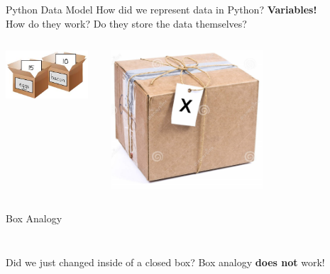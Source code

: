     \begin{frame}{Python Data Model}
        \LARGE
        How did we represent data in Python?
         \textbf{Variables!}\\
        How do they work?
         Do they store the data themselves?
        \begin{columns}
            \begin{column}{0.5\textwidth}
                \includegraphics[width=0.9\textwidth]{../Lecture5/images/box.jpg}
            \end{column}
            \begin{column}{0.5\textwidth}
                \includegraphics[width=0.6\textwidth]{../Lecture5/images/box_tag.jpg}
            \end{column}
        \end{columns}
    \end{frame}

    \begin{frame}{Box Analogy}
        \LARGE
        \inputminted[frame=single,framesep=2pt,lastline=4]{python3}{../Lecture5/code-examples/box_counter_ex.py}
        \inputminted[frame=single,framesep=2pt,firstline=6]{python3}{../Lecture5/code-examples/box_counter_ex.py}
        Did we just changed inside of a closed box?
         Box analogy \textbf{does not} work!
    \end{frame}

